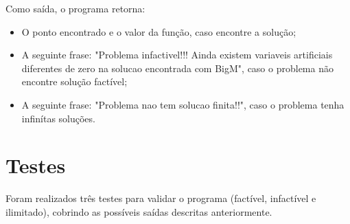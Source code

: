 \documentclass[a4paper]{article}
\begin{document}
Como sa\'ida, o programa retorna:

\begin{itemize}
\item O ponto encontrado e o valor da fun\c{c}\~ao, caso encontre a solu\c{c}\~ao;
\item A seguinte frase: "Problema infactivel!!! Ainda existem variaveis artificiais diferentes de zero na solucao encontrada com BigM", caso o problema n\~ao encontre solu\c{c}\~ao fact\'ivel;
\item A seguinte frase: "Problema nao tem solucao finita!!", caso o problema tenha infin\'itas solu\c{c}\~oes.
\end{itemize}
\section{Testes}
Foram realizados tr\^es testes para validar o programa (fact\'ivel, infact\'ivel e ilimitado), cobrindo as poss\'iveis sa\'idas descritas anteriormente.
\end{document}
